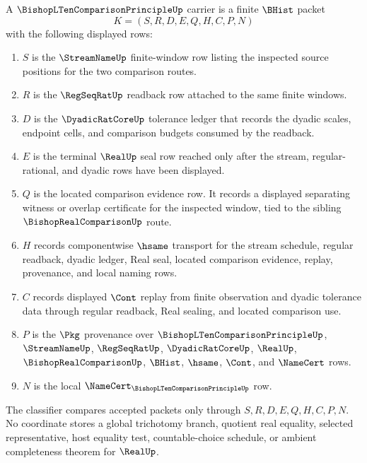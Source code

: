 \begin{definition}
\label{def:bishop-l10-comparison-principle-carrier}
A $\BishopLTenComparisonPrincipleUp$ carrier is a finite $\BHist$ packet
$$
K=(S,R,D,E,Q,H,C,P,N)
$$
with the following displayed rows:
\begin{enumerate}
\item $S$ is the $\StreamNameUp$ finite-window row listing the inspected source positions for the two comparison routes.
\item $R$ is the $\RegSeqRatUp$ readback row attached to the same finite windows.
\item $D$ is the $\DyadicRatCoreUp$ tolerance ledger that records the dyadic scales, endpoint cells, and comparison budgets consumed by the readback.
\item $E$ is the terminal $\RealUp$ seal row reached only after the stream, regular-rational, and dyadic rows have been displayed.
\item $Q$ is the located comparison evidence row. It records a displayed separating witness or overlap certificate for the inspected window, tied to the sibling $\BishopRealComparisonUp$ route.
\item $H$ records componentwise $\hsame$ transport for the stream schedule, regular readback, dyadic ledger, Real seal, located comparison evidence, replay, provenance, and local naming rows.
\item $C$ records displayed $\Cont$ replay from finite observation and dyadic tolerance data through regular readback, Real sealing, and located comparison use.
\item $P$ is the $\Pkg$ provenance over $\BishopLTenComparisonPrincipleUp$, $\StreamNameUp$, $\RegSeqRatUp$, $\DyadicRatCoreUp$, $\RealUp$, $\BishopRealComparisonUp$, $\BHist$, $\hsame$, $\Cont$, and $\NameCert$ rows.
\item $N$ is the local $\NameCert_{\BishopLTenComparisonPrincipleUp}$ row.
\end{enumerate}
The classifier compares accepted packets only through $S,R,D,E,Q,H,C,P,N$. No coordinate stores a global trichotomy branch, quotient real equality, selected representative, host equality test, countable-choice schedule, or ambient completeness theorem for $\RealUp$.
\end{definition}

